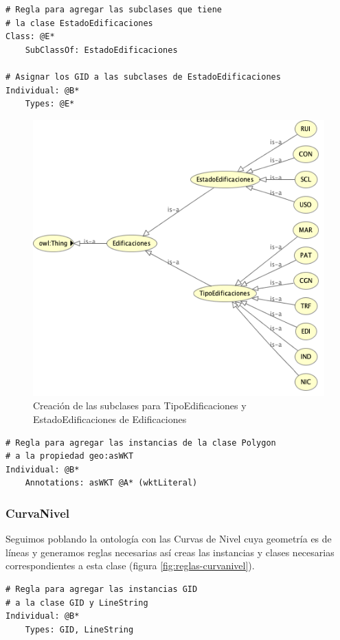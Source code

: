 \begin{lstlisting}
# Regla para agregar las subclases que tiene 
# la clase EstadoEdificaciones 
Class: @E*
	SubClassOf: EstadoEdificaciones

# Asignar los GID a las subclases de EstadoEdificaciones
Individual: @B*
	Types: @E*
\end{lstlisting}

\begin{figure}[H]
	\centering
	\includegraphics[width=0.7\linewidth]{imagenes/capitulo5/Edificaciones-copia}
	\caption{Creación de las subclases para TipoEdificaciones y EstadoEdificaciones de Edificaciones}
	\label{fig:edificaciones-copia}
\end{figure}



\begin{lstlisting}
# Regla para agregar las instancias de la clase Polygon
# a la propiedad geo:asWKT 
Individual: @B*
	Annotations: asWKT @A* (wktLiteral)
\end{lstlisting}



\subsubsection{CurvaNivel}

Seguimos poblando la ontología con las Curvas de Nivel cuya geometría es de líneas y generamos reglas necesarias así creas las instancias y clases necesarias correspondientes a esta clase (figura \ref{fig:reglas-curvanivel}).


\begin{lstlisting}
# Regla para agregar las instancias GID 
# a la clase GID y LineString
Individual: @B*
	Types: GID, LineString
\end{lstlisting}


